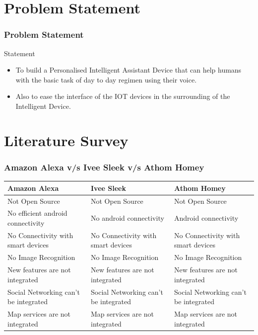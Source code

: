 \documentclass[xcolor=dvipsnames]{beamer}
\begin{document}
\section{Problem Statement}
\begin{frame} %
\frametitle{Problem Statement}
\begin{block}{Statement}
\begin{itemize}
\item To build a Personalised Intelligent Assistant Device that can help humans with the basic task of day to day regimen using their voice.
\item Also to ease the interface of the IOT devices in the surrounding of the Intelligent Device.
\end{itemize}
\end{block}
\end{frame}

\section{Literature Survey}
\begin{frame}
\frametitle{Amazon Alexa \small{v/s} \Large{Ivee Sleek} \small{v/s} \Large{Athom Homey}}
\begin{table}
\begin{tabular}{l l l}
\toprule
\textbf{Amazon Alexa} & \textbf{Ivee Sleek} & \textbf{Athom Homey}\\
\midrule
\tiny{Not Open Source} & \tiny{Not Open Source} & \tiny{Not Open Source} \\
\tiny{No efficient android connectivity} & \tiny{No android connectivity} & \tiny{Android connectivity} \\
\tiny{No Connectivity with smart devices}& \tiny{No Connectivity with smart devices}&\tiny{No Connectivity with smart devices}\\
\tiny{No Image Recognition}&\tiny{No Image Recognition}&\tiny{No Image Recognition}\\
\tiny{New features are not integrated}& \tiny{New features are not integrated}&\tiny{New features are not integrated}\\
\tiny{Social Networking can't be integrated}&\tiny{Social Networking can't be integrated}&\tiny{Social Networking can't be integrated}\\
\tiny{Map services are not integrated}&\tiny{Map services are not integrated}&\tiny{Map services are not integrated}\\
\bottomrule
\end{tabular}
\end{table}
\end{frame}
\end{document}
